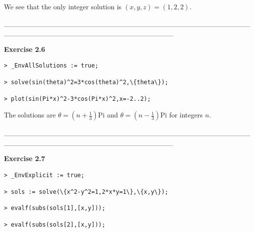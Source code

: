 \documentclass{article}
\begin{document}
\begin{Maple Normal}

\end{Maple Normal}
\begin{Maple Normal}
We see that the only integer solution is 
$(x ,y ,z)=(1,2,2)$.  
\end{Maple Normal}
\begin{Maple Normal}
\_\_\_\_\_\_\_\_\_\_\_\_\_\_\_\_\_\_\_\_\_\_\_\_\_\_\_\_\_\_\_\_\_\_\_\_\_\_\_\_\_\_\_\_\_\_\_\_\_\_\_\_\_\_\_\_\_\_\_\_\_\_\_\_\_\_\_\_\_\_\_\_\_\_\_\_\_\_\_\_\_
\end{Maple Normal}
\begin{Maple Heading 2}
\textbf{Exercise 2.6}
\end{Maple Heading 2}
\begin{lstlisting}
> _EnvAllSolutions := true;
\end{lstlisting}
\begin{lstlisting}
> solve(sin(theta)^2=3*cos(theta)^2,\{theta\});
\end{lstlisting}
\begin{lstlisting}
> plot(sin(Pi*x)^2-3*cos(Pi*x)^2,x=-2..2);
\end{lstlisting}
\begin{Maple Normal}

\end{Maple Normal}
\begin{Maple Normal}
The solutions are 
$\theta =(n +\frac{1}{3}) \mathrm{Pi}$ and 
$\theta =(n -\frac{1}{3}) \mathrm{Pi}$ for integers 
$n$.
\end{Maple Normal}
\begin{Maple Normal}
\_\_\_\_\_\_\_\_\_\_\_\_\_\_\_\_\_\_\_\_\_\_\_\_\_\_\_\_\_\_\_\_\_\_\_\_\_\_\_\_\_\_\_\_\_\_\_\_\_\_\_\_\_\_\_\_\_\_\_\_\_\_\_\_\_\_\_\_\_\_\_\_\_\_\_\_\_\_\_\_\_
\end{Maple Normal}
\begin{Maple Heading 2}
\textbf{Exercise 2.7}
\end{Maple Heading 2}
\begin{lstlisting}
> _EnvExplicit := true;
\end{lstlisting}
\begin{lstlisting}
> sols := solve(\{x^2-y^2=1,2*x*y=1\},\{x,y\});
\end{lstlisting}
\begin{lstlisting}
> evalf(subs(sols[1],[x,y]));
\end{lstlisting}
\begin{lstlisting}
> evalf(subs(sols[2],[x,y]));
\end{lstlisting}
\end{document}
